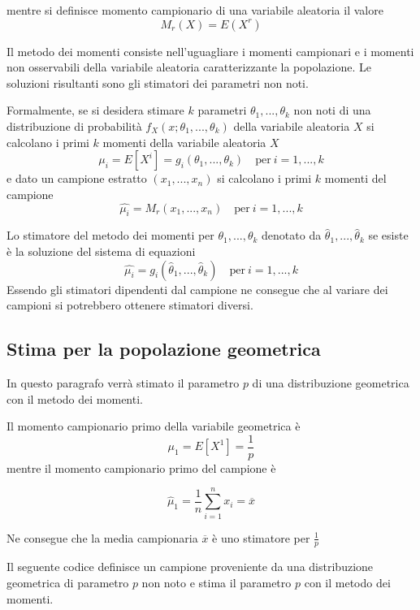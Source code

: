 \documentclass[]{book}
\begin{document}
mentre si definisce momento campionario di una variabile aleatoria il
valore \[M_r(X) = E(X^r)\]

Il metodo dei momenti consiste nell'uguagliare i momenti campionari e i
momenti non osservabili della variabile aleatoria caratterizzante la
popolazione. Le soluzioni risultanti sono gli stimatori dei parametri
non noti.

Formalmente, se si desidera stimare \(k\) parametri
\(\theta_1,...,\theta_k\) non noti di una distribuzione di probabilità
\(f_X(x;\theta_1,...,\theta_k)\) della variabile aleatoria \(X\) si
calcolano i primi \(k\) momenti della variabile aleatoria \(X\)
\[\mu_i = E[X^i] = g_i(\theta_1,...,\theta_k) \quad \text{per} \ i = 1,...,k\]
e dato un campione estratto \((x_1,...,x_n)\) si calcolano i primi \(k\)
momenti del campione\\
\[\hat{\mu_i} = M_r(x_1,...,x_n) \quad \text{per} \ i = 1,...,k \]

Lo stimatore del metodo dei momenti per \(\theta_1,...,\theta_k\)
denotato da \(\hat\theta_1,...,\hat\theta_k\) se esiste è la soluzione
del sistema di equazioni
\[\hat{\mu_i} = g_i(\hat\theta_1,...,\hat\theta_k)  \quad \text{per} \ i = 1,...,k \]
Essendo gli stimatori dipendenti dal campione ne consegue che al variare
dei campioni si potrebbero ottenere stimatori diversi.

\subsection{Stima per la popolazione
geometrica}\label{stima-per-la-popolazione-geometrica}

In questo paragrafo verrà stimato il parametro \(p\) di una
distribuzione geometrica con il metodo dei momenti.

Il momento campionario primo della variabile geometrica è
\[\mu_1 = E[X^1] = \frac{1}{p}\] mentre il momento campionario primo del
campione è

\[\hat\mu_1 = \frac{1}{n}\sum_{i=1}^nx_i = \overline{x}\]

Ne consegue che la media campionaria \(\overline{x}\) è uno stimatore
per \(\frac{1}{p}\)

Il seguente codice definisce un campione proveniente da una
distribuzione geometrica di parametro \(p\) non noto e stima il
parametro \(p\) con il metodo dei momenti.
\end{document}
